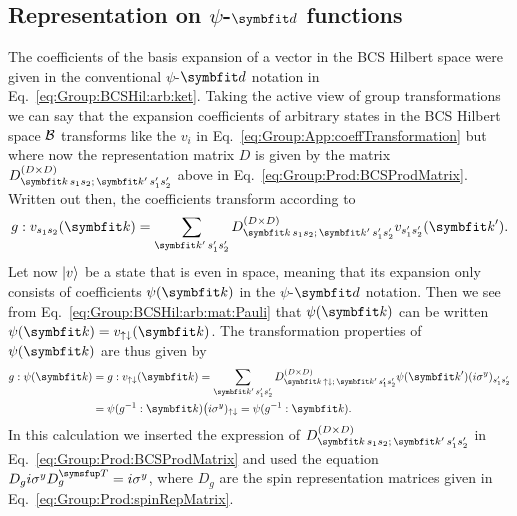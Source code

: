 \subsection{Representation on $\psi$-$\v{d}$ functions}

The coefficients of the basis expansion of a vector in the BCS Hilbert space were given in the conventional $\psi$-$\v{d}$ notation in 
Eq.~\eqref{eq:Group:BCSHil:arb:ket}. Taking the active view of group transformations we can say that the expansion coefficients of arbitrary states
in the BCS Hilbert space $\mathcal{B}$ transforms like the $v_i$ in Eq.~\eqref{eq:Group:App:coeffTransformation} but where now the representation
matrix $D$ is given by the matrix $D^{(D\times D)}_{\v{k}\,s_1s_2;\,\v{k}'\,s_1's_2'}$ above in Eq.~\eqref{eq:Group:Prod:BCSProdMatrix}. Written
out then, the coefficients transform according to
\begin{equation}
    \label{eq:Group:pdRep:coeffTrans}
    g:v_{s_1s_2}(\v{k}) = \sum_{\v{k}'\,s_1's_2'}D^{(D\times D)}_{\v{k}\,s_1s_2;\,\v{k}'\,s_1's_2'}v_{s_1's_2'}(\v{k}').
\end{equation}
Let now $\lvert v \rangle$ be a state that is even in space, meaning that its expansion only consists of coefficients $\psi(\v{k})$ in the $\psi$-$\v{d}$
notation. Then we see from Eq.~\eqref{eq:Group:BCSHil:arb:mat:Pauli} that $\psi(\v{k})$ can be written $\psi(\v{k}) = v_{\up\dn}(\v{k})$.
The transformation properties of $\psi(\v{k})$ are thus given by
\begin{equation}
    \label{eq:Group:pdRep:psiRep}
    \begin{split}
        g:\psi(\v{k}) &= g:v_{\up\dn}(\v{k}) = \sum_{\v{k}'\,s_1's_2'}D^{(D\times D)}_{\v{k}\,\up\dn;\,\v{k}'\,s_1's_2'}\psi(\v{k}')(i\sigma^y)_{s_1's_2'}\\
        &=\psi(g^{-1}:\v{k})\big(i\sigma^y)_{\up\dn} = \psi(g^{-1}:\v{k}).
    \end{split}
\end{equation}
In this calculation we inserted the expression of $D^{(D\times D)}_{\v{k}\,s_1s_2;\,\v{k}'\,s_1's_2'}$ in Eq.~\eqref{eq:Group:Prod:BCSProdMatrix} and used
the equation $D_gi\sigma^y D_g^\trans = i\sigma^y$, where $D_g$ are the spin representation matrices given in Eq.~\eqref{eq:Group:Prod:spinRepMatrix}.

